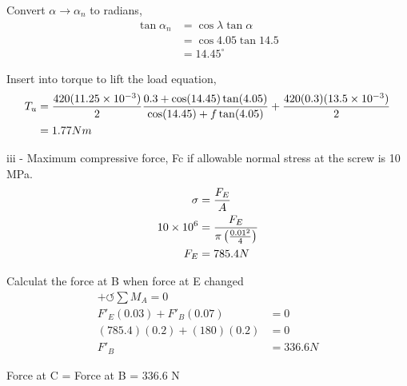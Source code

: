 \documentclass[a4paper, fleqn]{article}
\providecommand{\sci}[1]{\protect\ensuremath{\times 10^{\StrSubstitute[0]{#1}{e}{}}}}
\begin{document}
Convert $\alpha \rightarrow \alpha_n$ to radians,
\begin{equation*}
    \begin{aligned}
    \tan \alpha_n &= \cos \lambda \tan \alpha\\
     &= \cos 4.05 \tan 14.5\\
    &= 14.45^{\circ}
    \end{aligned} 
\end{equation*}

Insert into torque to lift the load equation,
\begin{equation*}
    \begin{aligned}
    T_u &= \frac{420(11.25\sci{e-3})}{2} \frac{0.3+\cos(14.45) \tan(4.05)}{\cos(14.45) + f\tan(4.05)} + \frac{420(0.3)(13.5\sci{e-3})}{2} \\
    &=1.77 Nm
    \end{aligned}
\end{equation*}

iii - Maximum compressive force, Fc if allowable normal stress at the screw is 10 MPa.
\begin{equation*}
    \begin{aligned}
    \sigma &= \frac{F_E}{A}\\
    10\sci{6}&=\frac{F_E}{\pi \left(\frac{0.01^2}{4}\right)}\\
    F_E &=785.4 N
    \end{aligned}
\end{equation*}

Calculat the force at B when force at E changed
\begin{equation*}
    \begin{aligned}
    +\circlearrowleft \sum M_A =0\\  
    F'_E(0.03)+F'_B(0.07) &=0\\ 
    (785.4)(0.2)+(180)(0.2) &=0\\ 
    F'_B &= 336.6 N
    \end{aligned}
\end{equation*}

Force at C = Force at B = 336.6 N
\end{document}
